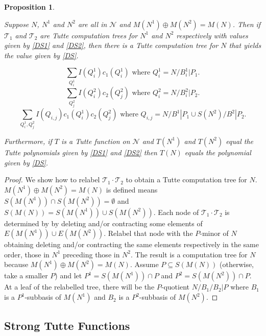 \documentclass[12pt,leqno]{amsart}
\newtheorem{prop}[lem]{Proposition}
\theoremstyle{remark}
\begin{document}
\begin{prop}
\label{SumProp2}

Suppose $N$, $N^1$ and $N^2$ are all in $\mathcal{N}$
and $M(N^1)\oplus M(N^2)=M(N)$.  Then if
$\mathcal{T}_1$ and $\mathcal{T}_2$ are Tutte computation
trees for $N^1$ and $N^2$ respectively with values given
by \eqref{DS1} and \eqref{DS2}, then there is a Tutte
computation tree for $N$ that yields the value given
by \eqref{DS}.

\begin{equation}
\label{DS1}
\tag{DS1}
\sum_{Q^1_i}I(Q^1_{i})c_1(Q^1_{i})\text{ where }Q^1_i=N/B^1_i|P_1.
\end{equation}
\begin{equation}
\label{DS2}
\tag{DS2}
\sum_{Q^2_j}I(Q^2_{i})c_2(Q^2_{j})\text{ where }Q^2_i=N/B^2_i|P_2.
\end{equation}
\begin{equation}
\tag{DS}
\label{DS}
\sum_{Q^1_i,Q^2_j}I(Q_{i,j})c_1(Q^1_{i})c_2(Q^2_{j})
\text{ where }Q_{i,j}=N/B^1|P_1\cup S(N^2)/B^2|P_2.
\end{equation}

Furthermore, if $T$ is a Tutte function on $\mathcal{N}$
and $T(N^1)$ and $T(N^2)$ equal the Tutte polynomials
given by \eqref{DS1} and \eqref{DS2} then 
$T(N)$ equals the polynomial given by \eqref{DS}.
\end{prop}

\begin{proof}

We show how to relabel $\mathcal{T}_1\cdot\mathcal{T}_2$ to obtain 
a Tutte computation tree for $N$.  $M(N^1)\oplus M(N^2)=M(N)$ is defined
means $S(M(N^1))\cap S(M(N^2))=\emptyset$ and 
$S(M(N))=S(M(N^1))\cup S(M(N^2))$.   Each node of 
$\mathcal{T}_1\cdot\mathcal{T}_2$ is determined by 
by deleting and/or contracting some elements of
$E(M(N^1))\cup E(M(N^2))$.  Relabel that node with the 
$P$-minor of $N$ obtaining deleting and/or contracting the
same elements respectively in the same order, those in $N^1$
preceding those in $N^2$.  The result is a computation tree for $N$
because $M(N^1)\oplus M(N^2)=M(N)$.  Assume $P\subseteq S(M(N))$
(otherwise, take a smaller $P$) and let $P^1=S(M(N^1))\cap P$
and $P^2=S(M(N^2))\cap P$.
At a leaf of the relabelled
tree, there will be the $P$-quotient $N/B_1/B_2|P$ where
$B_1$ is a $P^1$-subbasis of $M(N^1)$ and $B_2$ is a $P^2$-subbasis
of $M(N^2)$.  

\end{proof}

\subsection{Strong Tutte Functions}
\end{document}
